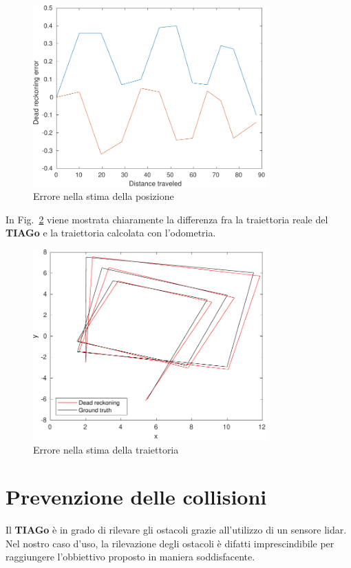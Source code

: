 \documentclass[a4paper]{article}
\begin{document}
	\begin{figure}[H]
		\centering
		\includegraphics[width=0.8\textwidth]{./img/dead_reckoning_error.pdf}
		\caption{Errore nella stima della posizione}
		\label{fig:dead_reckoning_error}
	\end{figure}

	In Fig.~\ref{fig:trajectory_error} viene mostrata chiaramente la differenza fra la traiettoria reale del \textbf{TIAGo} e la traiettoria calcolata con l'odometria.
	
	\begin{figure}[H]
		\centering
		\includegraphics[width=0.8\textwidth]{./img/trajectories.pdf}
		\caption{Errore nella stima della traiettoria}
		\label{fig:trajectory_error}
	\end{figure}
	
	
	\section{Prevenzione delle collisioni}\label{sec:Rilevamento-delle-collisioni} 
	Il \textbf{TIAGo} è in grado di rilevare gli ostacoli grazie all'utilizzo di un sensore lidar. Nel nostro caso d'uso, la rilevazione degli ostacoli è difatti imprescindibile per raggiungere l'obbiettivo proposto in maniera soddisfacente. 
	
\end{document}
